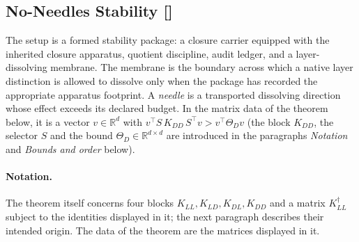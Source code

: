 \subsection{No-Needles Stability [\texorpdfstring{}{F6}]}\label{sec:stability:no-needles}

The setup is a formed stability package: a closure carrier equipped
with the inherited closure apparatus, quotient discipline, audit
ledger, and a layer-dissolving membrane.  The membrane is the
boundary across which a native layer distinction is allowed to
dissolve only when the package has recorded the appropriate
apparatus footprint.  A \emph{needle} is a transported dissolving direction whose effect exceeds
its declared budget. In the matrix data of the theorem below, it is a vector
\(v\in\mathbb R^d\) with
\(v^{\!\top}S\,K_{DD}\,S^{\!\top}v>v^{\!\top}\Theta_D v\) (the block \(K_{DD}\), the selector \(S\) and the bound \(\Theta_D\in\mathbb R^{d\times d}\) are introduced in the paragraphs \emph{Notation} and \emph{Bounds and order} below).

\paragraph{Notation.} The theorem itself concerns four blocks
\(K_{LL},K_{LD},K_{DL},K_{DD}\) and a matrix \(K_{LL}^{\dagger}\) subject to the
identities displayed in it; the next paragraph describes their
intended origin. The data of the theorem are the matrices displayed in it.
